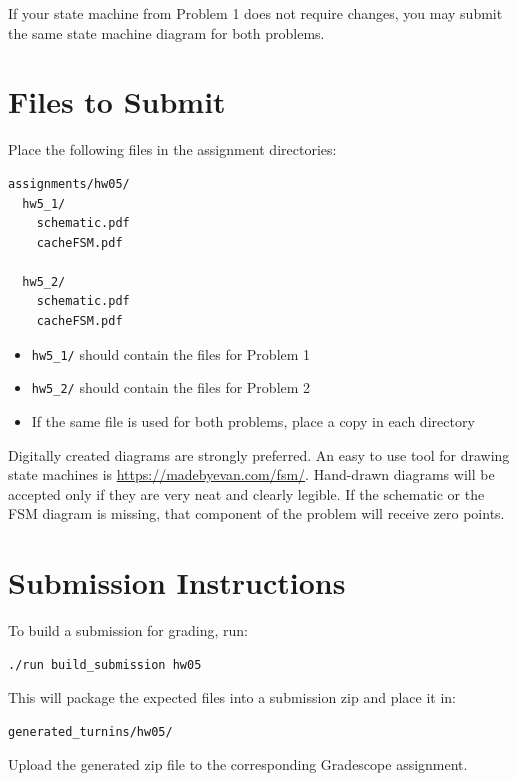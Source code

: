 \documentclass[12pt]{article}
\begin{document}
If your state machine from Problem 1 does not require changes, you may submit the same state machine diagram for both problems.

\section*{Files to Submit}

Place the following files in the assignment directories:

\begin{verbatim}
assignments/hw05/
  hw5_1/
    schematic.pdf
    cacheFSM.pdf

  hw5_2/
    schematic.pdf
    cacheFSM.pdf
\end{verbatim}

\begin{itemize}
\item \texttt{hw5\_1/} should contain the files for Problem 1
\item \texttt{hw5\_2/} should contain the files for Problem 2
\item If the same file is used for both problems, place a copy in each directory
\end{itemize}

Digitally created diagrams are strongly preferred.  An easy to use tool for drawing state machines
is \url{https://madebyevan.com/fsm/}.
Hand-drawn diagrams will be accepted only if they are very neat and clearly legible.
If the schematic or the FSM diagram is missing, that component of the problem will receive zero points.

\section*{Submission Instructions}

To build a submission for grading, run:

\begin{verbatim}
./run build_submission hw05
\end{verbatim}

This will package the expected files into a submission zip and place it in:

\begin{verbatim}
generated_turnins/hw05/
\end{verbatim}

Upload the generated zip file to the corresponding Gradescope assignment.
\end{document}
